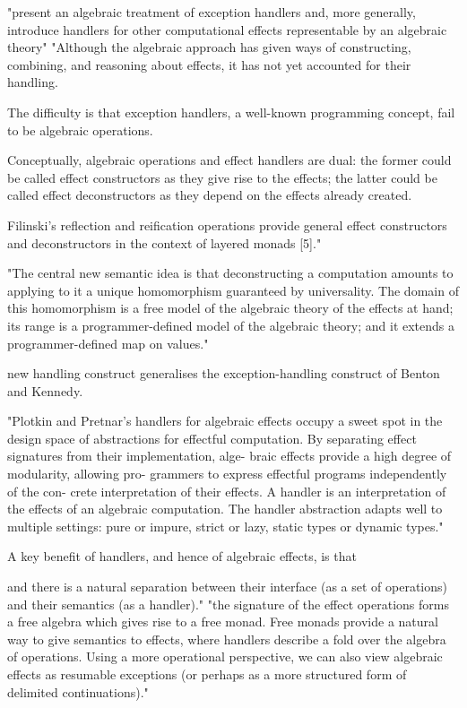 "present an algebraic treatment of exception handlers and,
more generally, introduce handlers for other computational effects
representable by an algebraic theory"
"Although the algebraic approach has given ways of constructing,
combining, and reasoning about effects, it has not yet accounted for their handling.


The difficulty is that exception handlers, a well-known programming concept,
fail to be algebraic operations.

Conceptually, algebraic operations and effect handlers are dual:
the former could be called effect constructors as they give rise to the effects;
the latter could be called effect deconstructors as they depend on the effects already created.

Filinski’s reflection and reification operations provide general effect constructors
and deconstructors in the context of layered monads [5]."

"The central new semantic idea is that deconstructing a computation amounts to
applying to it a unique homomorphism guaranteed by universality.
The domain of this homomorphism is a free model of the algebraic theory of the effects at hand;
its range is a programmer-defined model of the algebraic theory;
and it extends a programmer-defined map on values."
\cite{Plotkin:2009dr}


new handling construct generalises the exception-handling construct of Benton and Kennedy. \cite{benton2001exceptional}


"Plotkin and Pretnar’s handlers for algebraic effects occupy a sweet spot in the design space of abstractions for effectful computation. By separating effect signatures from their implementation, alge- braic effects provide a high degree of modularity, allowing pro- grammers to express effectful programs independently of the con- crete interpretation of their effects. A handler is an interpretation of the effects of an algebraic computation. The handler abstraction adapts well to multiple settings: pure or impure, strict or lazy, static types or dynamic types."
\cite{kammar2013handlers}

A key benefit of handlers, and hence of algebraic effects,
is that

and there is a natural separation between
their interface (as a set of operations)
and
their semantics (as a handler)."
"the signature of the effect operations forms a free algebra which gives rise to a free monad.
Free monads provide a natural way to give semantics to effects,
where handlers describe a fold over the algebra of operations.
Using a more operational perspective,
we can also view algebraic effects as resumable exceptions
(or perhaps as a more structured form of delimited continuations)."
\cite{leijen2017type}


